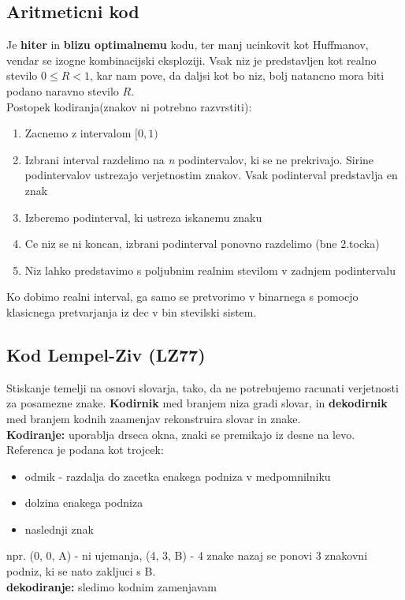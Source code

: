 \documentclass{article}
\begin{document}
\begin{multicols}{3}
\subsection{Aritmeticni kod}
Je \textbf{hiter} in \textbf{blizu optimalnemu} kodu, ter manj ucinkovit kot Huffmanov,
vendar se izogne kombinacijski eksploziji.
Vsak niz je predstavljen kot realno stevilo $0 \leq R < 1$, kar nam pove, da daljsi kot bo niz,
bolj natancno mora biti podano naravno stevilo $R$.\\
Postopek kodiranja(znakov ni potrebno razvrstiti):
\begin{enumerate}
    \item Zacnemo z intervalom $[0, 1)$
    \item Izbrani interval razdelimo na \textit{n} podintervalov, ki se ne prekrivajo. Sirine podintervalov ustrezajo
        verjetnostim znakov. Vsak podinterval predstavlja en znak
    \item Izberemo podinterval, ki ustreza iskanemu znaku
    \item Ce niz se ni koncan, izbrani podinterval ponovno razdelimo (bne 2.tocka)
    \item Niz lahko predstavimo s poljubnim realnim stevilom v zadnjem podintervalu
\end{enumerate}
Ko dobimo realni interval, ga samo se pretvorimo v binarnega s pomocjo klasicnega pretvarjanja
iz dec v bin stevilski sistem.

\subsection{Kod Lempel-Ziv (LZ77)} 
Stiskanje temelji na osnovi slovarja, tako, da ne potrebujemo
racunati verjetnosti za posamezne znake. \textbf{Kodirnik}
med branjem niza gradi slovar, in \textbf{dekodirnik} med branjem
kodnih zaamenjav rekonstruira slovar in znake.\\
\textbf{Kodiranje:} uporablja drseca okna, znaki se premikajo iz desne na levo.
Referenca je podana kot trojcek:
\begin{itemize}
    \item odmik - razdalja do zacetka enakega podniza v medpomnilniku
    \item dolzina enakega podniza
    \item naslednji znak
\end{itemize}
npr. (0, 0, A) - ni ujemanja, (4, 3, B) - 4 znake nazaj se ponovi 3 znakovni podniz, ki se nato zakljuci s B.\\
\textbf{dekodiranje:} sledimo kodnim zamenjavam


\end{multicols}
\end{document}
